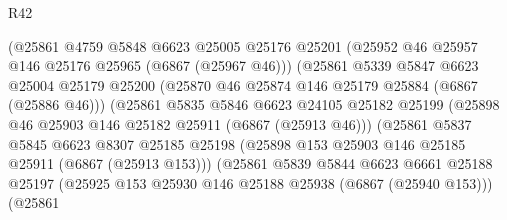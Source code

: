 \begin{lexlean}{R42}
\begin{coremodule}
{                                (@25861
                                  @4759
                                  @5848
                                  @6623
                                  @25005
                                  @25176
                                  @25201
                                  (@25952 @46 @25957 @146 @25176 @25965 (@6867 (@25967 @46)))
                                  (@25861
                                    @5339
                                    @5847
                                    @6623
                                    @25004
                                    @25179
                                    @25200
                                    (@25870 @46 @25874 @146 @25179 @25884 (@6867 (@25886 @46)))
                                    (@25861
                                      @5835
                                      @5846
                                      @6623
                                      @24105
                                      @25182
                                      @25199
                                      (@25898 @46 @25903 @146 @25182 @25911 (@6867 (@25913 @46)))
                                      (@25861
                                        @5837
                                        @5845
                                        @6623
                                        @8307
                                        @25185
                                        @25198
                                        (@25898
                                          @153
                                          @25903
                                          @146
                                          @25185
                                          @25911
                                          (@6867 (@25913 @153)))
                                        (@25861
                                          @5839
                                          @5844
                                          @6623
                                          @6661
                                          @25188
                                          @25197
                                          (@25925
                                            @153
                                            @25930
                                            @146
                                            @25188
                                            @25938
                                            (@6867 (@25940 @153)))
                                          (@25861
}
\end{coremodule}
\end{lexlean}
